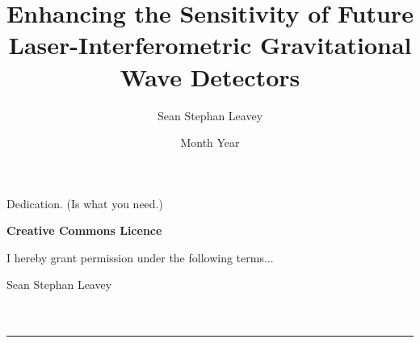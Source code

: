 \documentclass[twoside,nogutter]{glasgowthesis}
\begin{document}

\title{Enhancing the Sensitivity of Future Laser-Interferometric Gravitational Wave Detectors}
\author{Sean Stephan Leavey}
\date{Month Year}

\maketitle

\cleardoublepage



\newpage


\cleardoublepage
\vspace*{1.75in}
\begin{flushright} Dedication. (Is what you need.)\end{flushright}



\newpage

\vspace*{1.75in}
\begin{center} {\bf Creative Commons Licence}\end{center}
\noindent I hereby grant permission under the following terms...

\begin{description}
\item Sean Stephan Leavey\ \\ \ \\ \ \\
\hrule
\end{description}
\newpage


 

\newpage


\renewcommand{\contentsname}{Table of contents}
\tableofcontents

\listoftables
{}
\end{document}
